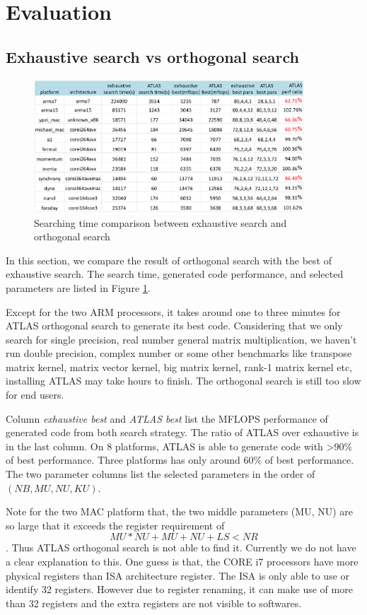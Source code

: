 \section{Evaluation}
\label{sec:evaluation}

  \subsection{Exhaustive search vs \atl orthogonal search}
  \label{sec:exhaustiveVSorthogonal}
  \begin{figure}[tbhp]
    \centering
    \includegraphics[width=0.9\textwidth]{images/exhaustiveVsorthogonal.png}
    \caption{Searching time comparison between exhaustive search and \atl orthogonal search}
    \label{fig:exhaustiveVsorthogonal}
  \end{figure}
  In this section, we compare the result of \atl orthogonal search with the best of exhaustive
  search. The search time, generated code performance, and selected parameters are listed in Figure
  \ref{fig:exhaustiveVsorthogonal}.\par
  Except for the two ARM processors, it takes around one to three minutes for ATLAS orthogonal search
  to generate its best code. Considering that we only search for single precision, real number general
  matrix multiplication, we haven't run double precision, complex number or some other benchmarks
  like transpose matrix kernel, matrix vector kernel, big matrix kernel, rank-1 matrix kernel etc, installing
  ATLAS may take hours to finish. The orthogonal search is still too slow for end users.\par
  Column \textit{exhaustive best} and \textit{ATLAS best} list the MFLOPS performance of generated code from
  both search strategy. The ratio of ATLAS over exhaustive is in the last column. On 8 platforms,
  ATLAS is able to generate code with >90\% of best performance. Three platforms has only around 60\% of
  best performance. The two parameter columns list the selected parameters in the order of $(NB, MU, NU, KU)$.\par
  Note for the two MAC platform that, the two middle parameters (MU, NU) are so large that it exceeds
  the register requirement of \[ MU*NU + MU + NU + LS < NR \]. Thus ATLAS orthogonal search is not able
  to find it. Currently we do not have a clear explanation to this. One guess is that, the CORE i7 processors
  have more physical registers than ISA architecture register. The ISA is only able to use or identify 32 registers.
  However due to register renaming, it can make use of more than 32 registers and the extra registers are not visible
  to softwares.\par

